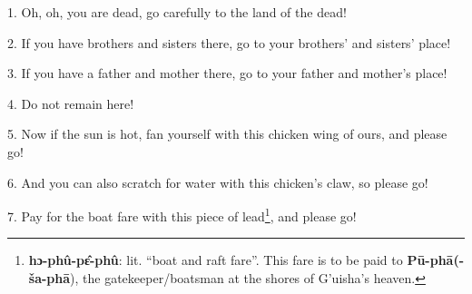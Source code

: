 \setcounter{footnote}{0}

1. Oh, oh, you are dead, go carefully to the land of the dead!

2. If you have brothers and sisters there, go to your brothers' and sisters' place!

3. If you have a father and mother there, go to your father and mother's place!

4. Do not remain here!

5. Now if the sun is hot, fan yourself with this chicken wing of ours, and please
go!

6. And you can also scratch for water with this chicken's claw, so please go!

7. Pay for the boat fare with this piece of lead\footnote{\textbf{hɔ-phû-pɛ̂-phû}: lit. ``boat and raft fare''. This fare is to be paid to \textbf{Pū-phā(-ša-phā}), the gatekeeper/boatsman at the shores of G'uisha's heaven.}, and please go!

